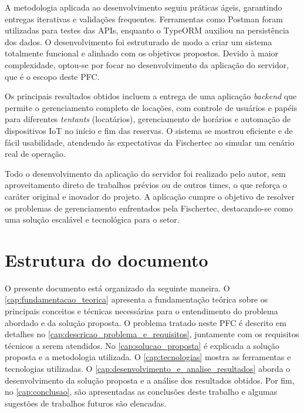 A metodologia aplicada ao desenvolvimento seguiu práticas ágeis, garantindo entregas iterativas e validações frequentes. Ferramentas como Postman foram utilizadas para testes das APIs, enquanto o TypeORM auxiliou na persistência dos dados. O desenvolvimento foi estruturado de modo a criar um sistema totalmente funcional e alinhado com os objetivos propostos. Devido à maior complexidade, optou-se por focar no desenvolvimento da aplicação do servidor, que é o escopo deste PFC.

Os principais resultados obtidos incluem a entrega de uma aplicação \textit{backend} que permite o gerenciamento completo de locações, com controle de usuários e papéis para diferentes \textit{tentants} (locatários), gerenciamento de horários e automação de dispositivos IoT no início e fim das reservas. O sistema se mostrou eficiente e de fácil usabilidade, atendendo às expectativas da Fischertec ao simular um cenário real de operação. 

Todo o desenvolvimento da aplicação do servidor foi realizado pelo autor, sem aproveitamento direto de trabalhos prévios ou de outros times, o que reforça o caráter original e inovador do projeto. A aplicação cumpre o objetivo de resolver os problemas de gerenciamento enfrentados pela Fischertec, destacando-se como uma solução escalável e tecnológica para o setor.

\section{Estrutura do documento}

O presente documento está organizado da seguinte maneira. O \autoref{cap:fundamentacao_teorica} apresenta a fundamentação teórica sobre os principais conceitos e técnicas necessárias para o entendimento do problema abordado e da solução proposta. O problema tratado neste PFC é descrito em detalhes no \autoref{cap:descricao_problema_e_requisitos}, juntamente com os requisitos técnicos a serem atendidos. No \autoref{cap:solucao_proposta} é explicada a solução proposta e a metodologia utilizada. O \autoref{cap:tecnologias} mostra as ferramentas e tecnologias utilizadas. O \autoref{cap:desenvolvimento_e_analise_resultados} aborda o desenvolvimento da solução proposta e a análise dos resultados obtidos. Por fim, no \autoref{cap:conclusao}, são apresentadas as conclusões deste trabalho e algumas sugestões de trabalhos futuros são elencadas.
